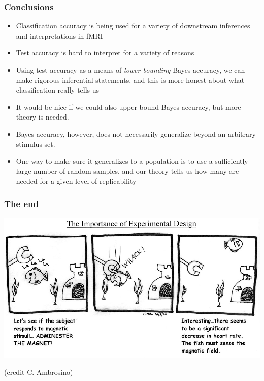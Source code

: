 \documentclass{beamer}
\begin{document}
\begin{frame}
\frametitle{Conclusions}
\begin{itemize}
\item Classification accuracy is being used for a variety of downstream inferences and interpretations in fMRI \pause
\item Test accuracy is hard to interpret for a variety of reasons \pause
\item Using test accuracy as a means of \emph{lower-bounding} Bayes accuracy, we can make rigorous inferential statements, and this is more honest about what classification really tells us \pause
\item It would be nice if we could also upper-bound Bayes accuracy, but more theory is needed. \pause
\item Bayes accuracy, however, does not necessarily generalize beyond an arbitrary stimulus set. \pause
\item One way to make sure it generalizes to a population is to use a
  sufficiently large number of random samples, and our theory tells us
  how many are needed for a given level of replicability
\end{itemize}
\end{frame}


\begin{frame}
\frametitle{The end}
\begin{center}
\includegraphics[scale = 1]{c_ambrosino.jpg}


{\tiny(credit C. Ambrosino)}
\end{center}
\end{frame}
\end{document}
